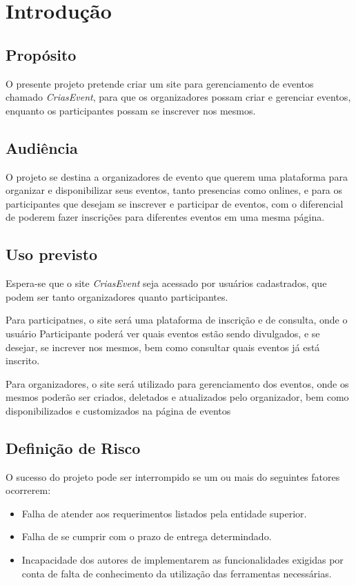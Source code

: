 \chapter{Introdução}
\label{ch:intro}
\section{Propósito}
    O presente projeto pretende criar um site para gerenciamento de eventos chamado \textit{CriasEvent}, para que os organizadores possam criar e gerenciar eventos, enquanto os participantes possam se inscrever nos mesmos.
\section{Audiência}
    O projeto se destina a organizadores de evento que querem uma plataforma para organizar e disponibilizar seus eventos, tanto presencias como onlines, e para os participantes que desejam se inscrever e participar de eventos, com o diferencial de poderem fazer inscrições para diferentes eventos em uma mesma página.
\section{Uso previsto}
  Espera-se que o site \textit{CriasEvent} seja acessado por usuários cadastrados, que podem ser tanto organizadores quanto participantes. 

  Para participatnes, o site será uma plataforma de inscrição e de consulta, onde o usuário Participante poderá ver quais eventos estão sendo divulgados, e se desejar, se increver nos mesmos, bem como consultar quais eventos já está inscrito. 

  Para organizadores, o site será utilizado para gerenciamento dos eventos, onde os mesmos poderão ser criados, deletados e atualizados pelo organizador, bem como disponibilizados e customizados na página de eventos


\section{Definição de Risco}
    O sucesso do projeto pode ser interrompido se um ou mais do seguintes fatores ocorrerem:
    \begin{itemize}
        \item Falha de atender aos requerimentos listados pela entidade superior.
        \item Falha de se cumprir com o prazo de entrega determindado.
        \item Incapacidade dos autores de implementarem as funcionalidades exigidas por conta de falta de conhecimento da utilização das ferramentas necessárias.
    \end{itemize}


